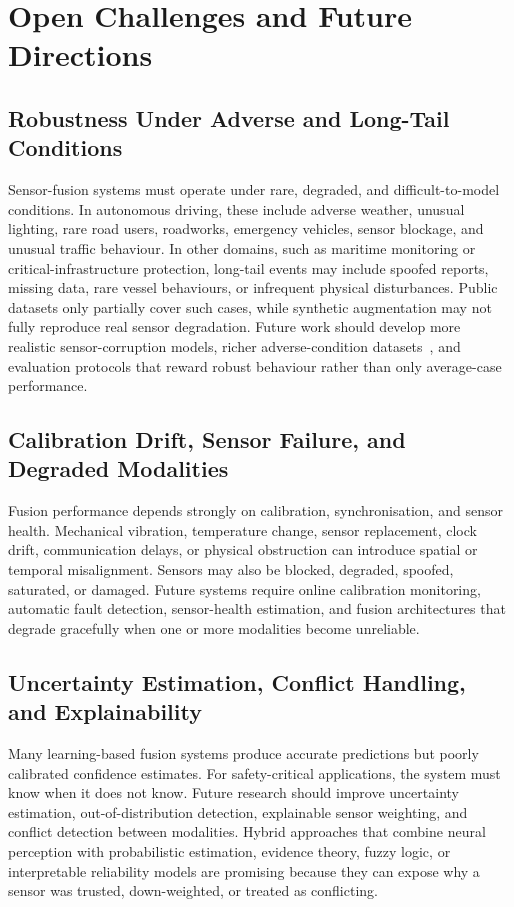 \documentclass[11pt,oneside,openany]{book}
\newcommand{\addednew}[1]{\textcolor{RevisionOlive}{#1}}
\begin{document}
\chapter{Open Challenges and Future Directions}
\label{sec:open-challenges}

\section{Robustness Under Adverse and Long-Tail Conditions}

Sensor-fusion systems must operate under rare, degraded, and difficult-to-model conditions. In autonomous driving, these include adverse weather, unusual lighting, rare road users, roadworks, emergency vehicles, sensor blockage, and unusual traffic behaviour. In other domains, such as maritime monitoring or critical-infrastructure protection, long-tail events may include spoofed reports, missing data, rare vessel behaviours, or infrequent physical disturbances. Public datasets only partially cover such cases, while synthetic augmentation may not fully reproduce real sensor degradation. Future work should develop more realistic sensor-corruption models, richer adverse-condition datasets\addednew{~\cite{bijelic2020_stf,dong2023_robobev}}, and evaluation protocols that reward robust behaviour rather than only average-case performance.

\section{Calibration Drift, Sensor Failure, and Degraded Modalities}

Fusion performance depends strongly on calibration, synchronisation, and sensor health. Mechanical vibration, temperature change, sensor replacement, clock drift, communication delays, or physical obstruction can introduce spatial or temporal misalignment. Sensors may also be blocked, degraded, spoofed, saturated, or damaged. Future systems require online calibration monitoring, automatic fault detection, sensor-health estimation, and fusion architectures that degrade gracefully when one or more modalities become unreliable.

\section{Uncertainty Estimation, Conflict Handling, and Explainability}

Many learning-based fusion systems produce accurate predictions but poorly calibrated confidence estimates. For safety-critical applications, the system must know when it does not know. Future research should improve uncertainty estimation, out-of-distribution detection, explainable sensor weighting, and conflict detection between modalities. Hybrid approaches that combine neural perception with probabilistic estimation, evidence theory, fuzzy logic, or interpretable reliability models are promising because they can expose why a sensor was trusted, down-weighted, or treated as conflicting.
\end{document}
